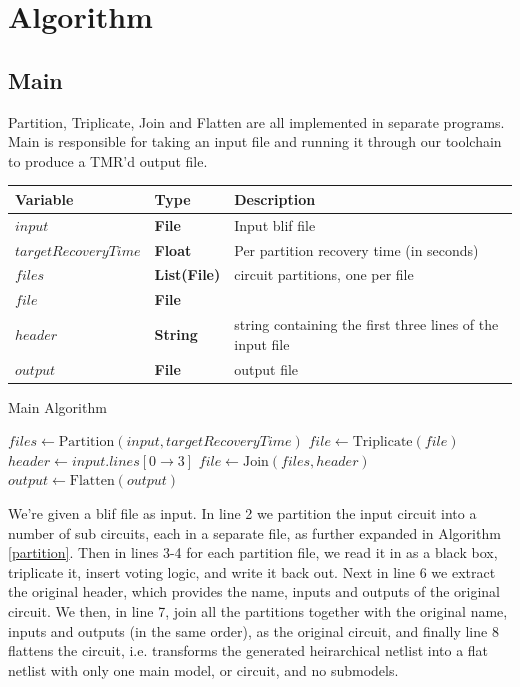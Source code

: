 \documentclass[12pt,final,oneside]{dwThesis} %
\begin{document}
   \newpage \section{Algorithm}\label{secAlgorithm} \subsection{Main}
   Partition, Triplicate, Join and Flatten are all implemented in separate
   programs. Main is responsible for taking an input file and running it
   through our toolchain to produce a TMR'd output file.


   \begin{algorithm} \begin{center} \begin{tabular}{lll} \toprule Variable &
            Type & Description\\ \midrule $input$ & \textbf{File} &  Input blif
            file\\ $targetRecoveryTime$ & \textbf{ Float} &  Per partition
            recovery time (in seconds) \\ $files$ & \textbf{List(File)} &
            circuit partitions, one per file \\ $file$ & \textbf{File} &  \\
            $header$ & \textbf{ String} &  string containing the first three
            lines of the input file \\ $output$ & \textbf{File} &  output
            file\\ \bottomrule \end{tabular} \end{center} \caption{Main
         Algorithm}\label{main} \begin{algorithmic}[1]
          \State $files \gets
         \mbox{Partition}(input, targetRecoveryTime)$  \State $file \gets \mbox{Triplicate}(file)$ \EndFor \State
         $header \gets input.lines[0\to 3]$ \State $file \gets
         \mbox{Join}(files, header)$ \State $output \gets
         \mbox{Flatten}(output)$ \EndProcedure \end{algorithmic}
   \end{algorithm} We're given a blif file as input.  In line 2 we partition
   the input circuit into a number of sub circuits, each in a separate file, as
   further expanded in Algorithm \ref{partition}.  Then in lines 3-4 for each
   partition file, we read it in as a black box, triplicate it, insert voting
   logic, and write it back out.  Next in line 6 we extract the original
   header, which provides the name, inputs and outputs of the original circuit.
   We then, in line 7, join all the partitions together with the original name,
   inputs and outputs (in the same order), as the original circuit, and finally
   line 8 flattens the circuit, i.e. transforms the generated heirarchical
   netlist into a flat netlist with only one main model, or circuit, and no
   submodels.
\end{document}
